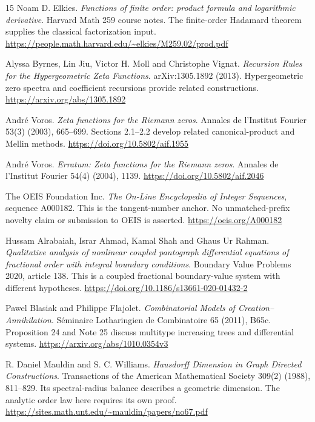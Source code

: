\begin{thebibliography}{15}
 Noam D. Elkies.
\emph{Functions of finite order: product formula and logarithmic derivative}.
Harvard Math 259 course notes. The finite-order Hadamard theorem supplies the
classical factorization input.
\url{https://people.math.harvard.edu/~elkies/M259.02/prod.pdf}

 Alyssa Byrnes, Lin Jiu, Victor H. Moll and Christophe Vignat.
\emph{Recursion Rules for the Hypergeometric Zeta Functions}.
arXiv:1305.1892 (2013). Hypergeometric zero spectra and coefficient recursions
provide related constructions.
\url{https://arxiv.org/abs/1305.1892}

 André Voros.
\emph{Zeta functions for the Riemann zeros}.
Annales de l'Institut Fourier 53(3) (2003), 665--699.
Sections 2.1--2.2 develop related canonical-product and Mellin methods.
\url{https://doi.org/10.5802/aif.1955}

 André Voros.
\emph{Erratum: Zeta functions for the Riemann zeros}.
Annales de l'Institut Fourier 54(4) (2004), 1139.
\url{https://doi.org/10.5802/aif.2046}

 The OEIS Foundation Inc.
\emph{The On-Line Encyclopedia of Integer Sequences}, sequence A000182.
This is the tangent-number anchor. No unmatched-prefix novelty claim or
submission to OEIS is asserted.
\url{https://oeis.org/A000182}

 Hussam Alrabaiah, Israr Ahmad, Kamal Shah and Ghaus Ur Rahman.
\emph{Qualitative analysis of nonlinear coupled pantograph differential
equations of fractional order with integral boundary conditions}.
Boundary Value Problems 2020, article 138.
This is a coupled fractional boundary-value system with different hypotheses.
\url{https://doi.org/10.1186/s13661-020-01432-2}

 Pawel Blasiak and Philippe Flajolet.
\emph{Combinatorial Models of Creation--Annihilation}.
Séminaire Lotharingien de Combinatoire 65 (2011), B65c.
Proposition 24 and Note 25 discuss multitype increasing trees and differential systems.
\url{https://arxiv.org/abs/1010.0354v3}

 R. Daniel Mauldin and S. C. Williams.
\emph{Hausdorff Dimension in Graph Directed Constructions}.
Transactions of the American Mathematical Society 309(2) (1988), 811--829.
Its spectral-radius balance describes a geometric dimension. The analytic
order law here requires its own proof.
\url{https://sites.math.unt.edu/~mauldin/papers/no67.pdf}


\end{thebibliography}

